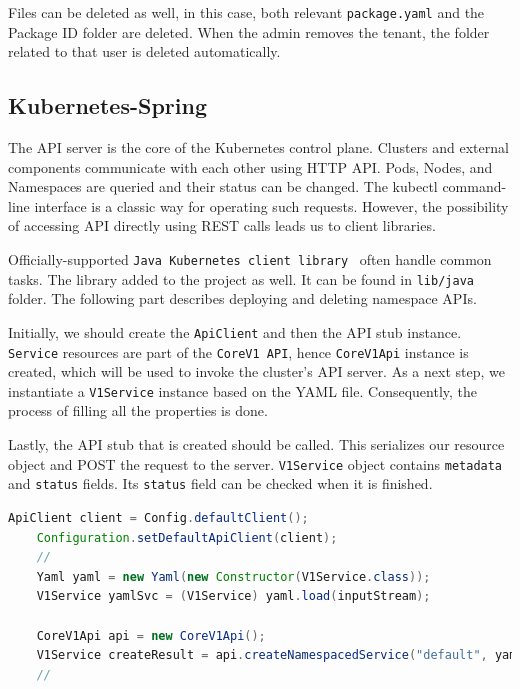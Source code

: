 Files can be deleted as well, in this case, both relevant \texttt{package.yaml} and the Package ID folder are deleted. When the admin removes the tenant, the folder related to that user is deleted automatically.

\subsection{Kubernetes-Spring}
\label{subsec:kubernetes-spring-2}

The API server is the core of the Kubernetes control plane. Clusters and external components communicate with each other using HTTP API. Pods, Nodes, and Namespaces are queried and their status can be changed. The kubectl command-line interface is a classic way for operating such requests. However, the possibility of accessing API directly using REST calls leads us to client libraries.

Officially-supported \texttt{Java Kubernetes client library}~\cite{java-k8s-client-lib} often handle common tasks. The library added to the project as well. It can be found in \texttt{lib/java} folder. The following part describes deploying and deleting namespace APIs.

Initially, we should create the \texttt{ApiClient} and then the API stub instance.  \texttt{Service} resources are part of the  \texttt{CoreV1 API}, hence  \texttt{CoreV1Api} instance is created, which will be used to invoke the cluster's API server. As a next step, we instantiate a  \texttt{V1Service} instance based on the YAML file. Consequently, the process of filling all the properties is done. 

Lastly, the API stub that is created should be called. This serializes our resource object and POST the request to the server. \texttt{V1Service} object contains \texttt{metadata} and \texttt{status} fields. Its \texttt{status} field can be checked when it is finished.
\begin{lstlisting}[language={Java}]
    ApiClient client = Config.defaultClient();
    Configuration.setDefaultApiClient(client);
    //
    Yaml yaml = new Yaml(new Constructor(V1Service.class));
    V1Service yamlSvc = (V1Service) yaml.load(inputStream);

    CoreV1Api api = new CoreV1Api();
    V1Service createResult = api.createNamespacedService("default", yamlSvc, null, null, null);
    //
\end{lstlisting}

